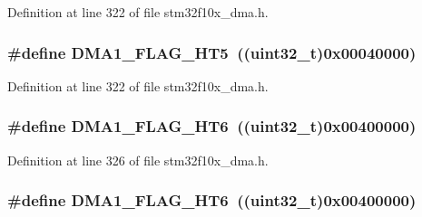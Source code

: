 Definition at line 322 of file stm32f10x\+\_\+dma.\+h.

\subsubsection[{\texorpdfstring{D\+M\+A1\+\_\+\+F\+L\+A\+G\+\_\+\+H\+T5}{DMA1_FLAG_HT5}}]{\setlength{\rightskip}{0pt plus 5cm}\#define D\+M\+A1\+\_\+\+F\+L\+A\+G\+\_\+\+H\+T5~(({\bf uint32\+\_\+t})0x00040000)}\hypertarget{group___d_m_a__flags__definition_ga648a2eb0b008ab009f03d207596c3cd7}{}\label{group___d_m_a__flags__definition_ga648a2eb0b008ab009f03d207596c3cd7}


Definition at line 322 of file stm32f10x\+\_\+dma.\+h.

\subsubsection[{\texorpdfstring{D\+M\+A1\+\_\+\+F\+L\+A\+G\+\_\+\+H\+T6}{DMA1_FLAG_HT6}}]{\setlength{\rightskip}{0pt plus 5cm}\#define D\+M\+A1\+\_\+\+F\+L\+A\+G\+\_\+\+H\+T6~(({\bf uint32\+\_\+t})0x00400000)}\hypertarget{group___d_m_a__flags__definition_ga0d594cb12f86f19c9562d82c3ca505bc}{}\label{group___d_m_a__flags__definition_ga0d594cb12f86f19c9562d82c3ca505bc}


Definition at line 326 of file stm32f10x\+\_\+dma.\+h.

\subsubsection[{\texorpdfstring{D\+M\+A1\+\_\+\+F\+L\+A\+G\+\_\+\+H\+T6}{DMA1_FLAG_HT6}}]{\setlength{\rightskip}{0pt plus 5cm}\#define D\+M\+A1\+\_\+\+F\+L\+A\+G\+\_\+\+H\+T6~(({\bf uint32\+\_\+t})0x00400000)}\hypertarget{group___d_m_a__flags__definition_ga0d594cb12f86f19c9562d82c3ca505bc}{}\label{group___d_m_a__flags__definition_ga0d594cb12f86f19c9562d82c3ca505bc}


